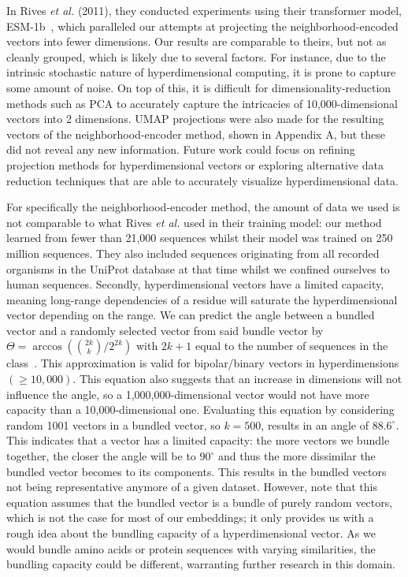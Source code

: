 In Rives \textit{et al.} (2011), they conducted experiments using their transformer model, ESM-1b~\cite{esm}, which paralleled our attempts at projecting the neighborhood-encoded vectors into fewer dimensions. Our results are comparable to theirs, but not as cleanly grouped, which is likely due to several factors. For instance, due to the intrinsic stochastic nature of hyperdimensional computing, it is prone to capture some amount of noise. On top of this, it is difficult for dimensionality-reduction methods such as PCA to accurately capture the intricacies of 10,000-dimensional vectors into 2 dimensions. UMAP projections were also made for the resulting vectors of the neighborhood-encoder method, shown in Appendix A, but these did not reveal any new information. Future work could focus on refining projection methods for hyperdimensional vectors or exploring alternative data reduction techniques that are able to accurately visualize hyperdimensional data. 

For specifically the neighborhood-encoder method, the amount of data we used is not comparable to what Rives \textit{et al.} used in their training model: our method learned from fewer than 21,000 sequences whilst their model was trained on 250 million sequences. They also included sequences originating from all recorded organisms in the UniProt database at that time whilst we confined ourselves to human sequences. Secondly, hyperdimensional vectors have a limited capacity, meaning long-range dependencies of a residue will saturate the hyperdimensional vector depending on the range. We can predict the angle between a bundled vector and a randomly selected vector from said bundle vector by $\Theta = \arccos({2k \choose k}/2^{2k})$ with $2k+1$ equal to the number of sequences in the class~\cite{sathdv}. This approximation is valid for bipolar/binary vectors in hyperdimensions $(\ge 10,000)$. This equation also suggests that an increase in dimensions will not influence the angle, so a 1,000,000-dimensional vector would not have more capacity than a 10,000-dimensional one. Evaluating this equation by considering random 1001 vectors in a bundled vector, so $k = 500$, results in an angle of $88.6^{\circ}$. This indicates that a vector has a limited capacity: the more vectors we bundle together, the closer the angle will be to $90^{\circ}$ and thus the more dissimilar the bundled vector becomes to its components. This results in the bundled vectors not being representative anymore of a given dataset. However, note that this equation assumes that the bundled vector is a bundle of purely random vectors, which is not the case for most of our embeddings; it only provides us with a rough idea about the bundling capacity of a hyperdimensional vector. As we would bundle amino acids or protein sequences with varying similarities, the bundling capacity could be different, warranting further research in this domain.

